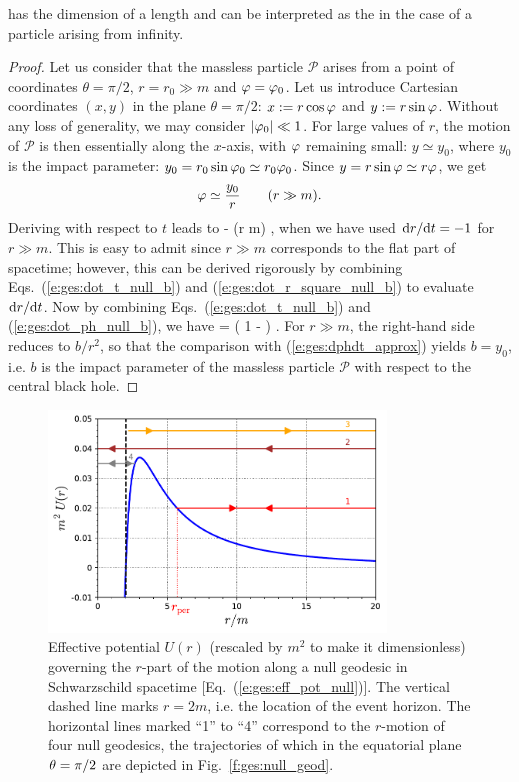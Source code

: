 has the dimension of a length and can be interpreted as the
 in the case of a
particle arising from infinity.
\begin{proof}
Let us consider that the massless
particle $\mathscr{P}$ arises from a point of coordinates $\theta=\pi/2$,
$r=r_0 \gg m$ and $\varphi = \varphi_0$.  Let us introduce
Cartesian coordinates $(x,y)$ in the plane $\theta=\pi/2$:
$x:=r\cos\varphi$ and $y:=r\sin\varphi$.
Without any loss of generality, we may
consider $|\varphi_0| \ll 1$. For large values of $r$, the motion of
$\mathscr{P}$ is then essentially along the $x$-axis, with $\varphi$ remaining small:
$y\simeq y_0$, where  $y_0$ is the impact parameter:
$y_0 = r_0 \sin\varphi_0 \simeq r_0 \varphi_0$. Since $y=r\sin\varphi\simeq r\varphi$, we get
\[
    \varphi \simeq \frac{y_0}{r} \qquad (r \gg m) .
\]
Deriving with respect to $t$ leads to
\be \label{e:ges:dphdt_approx}
     \simeq -  
                  \simeq {}  \qquad (r \gg m) ,
\ee
when we have used $\mathrm{d} r / \mathrm{d} t = - 1$ for $r \gg m$. This is easy
to admit since
$r\gg m$ corresponds to the flat part of spacetime; however, this can be derived
rigorously by combining Eqs.~(\ref{e:ges:dot_t_null_b}) and
(\ref{e:ges:dot_r_square_null_b}) to evaluate $\mathrm{d} r / \mathrm{d} t$.
Now by combining Eqs.~(\ref{e:ges:dot_t_null_b}) and (\ref{e:ges:dot_ph_null_b}),
we have
\be
     =  \left( 1 -  \right) .
\ee
For $r\gg m$, the right-hand side reduces to $b/r^2$, so that the comparison
with (\ref{e:ges:dphdt_approx}) yields $b = y_0$, i.e. $b$ is the impact
parameter of the massless particle $\mathscr{P}$ with respect to the central
black hole.
\end{proof}

\begin{figure}
\centerline{\includegraphics[width=0.8\textwidth]{ges_eff_pot_null.pdf}}
\caption[]{\label{f:ges:eff_pot_null} \footnotesize
Effective potential $U(r)$ (rescaled by $m^2$ to make it dimensionless)
governing the $r$-part of the
motion along a null geodesic in
Schwarzschild spacetime [Eq.~(\ref{e:ges:eff_pot_null})].
The vertical dashed line marks $r=2m$, i.e. the
location of the event horizon. The horizontal lines marked ``1'' to ``4''
correspond to the $r$-motion of four null geodesics,
the trajectories of which in the equatorial plane $\theta=\pi/2$
are depicted in Fig.~\ref{f:ges:null_geod}.}
\end{figure}

